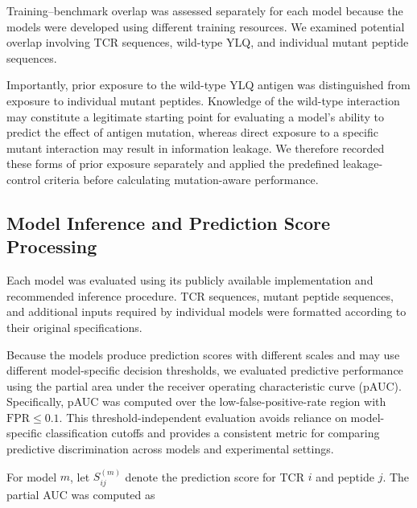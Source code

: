 Training--benchmark overlap was assessed separately for each model because 
the models were developed using different training resources. We examined 
potential overlap involving TCR sequences, wild-type YLQ, and individual 
mutant peptide sequences.


Importantly, prior exposure to the wild-type YLQ antigen was distinguished 
from exposure to individual mutant peptides. Knowledge of the wild-type 
interaction may constitute a legitimate starting point for evaluating a 
model's ability to predict the effect of antigen mutation, whereas direct 
exposure to a specific mutant interaction may result in information leakage. 
We therefore recorded these forms of prior exposure separately and applied 
the predefined leakage-control criteria before calculating mutation-aware 
performance.




\subsection{Model Inference and Prediction Score Processing}

Each model was evaluated using its publicly available implementation and
recommended inference procedure. TCR sequences, mutant peptide sequences,
and additional inputs required by individual models were formatted according
to their original specifications.

Because the models produce prediction scores with different scales and may
use different model-specific decision thresholds, we evaluated predictive
performance using the partial area under the receiver operating characteristic
curve (pAUC). Specifically, pAUC was computed over the low-false-positive-rate
region with $\mathrm{FPR} \leq 0.1$. This threshold-independent evaluation
avoids reliance on model-specific classification cutoffs and provides a
consistent metric for comparing predictive discrimination across models and
experimental settings.

For model $m$, let $S_{ij}^{(m)}$ denote the prediction score for TCR $i$
and peptide $j$. The partial AUC was computed as

